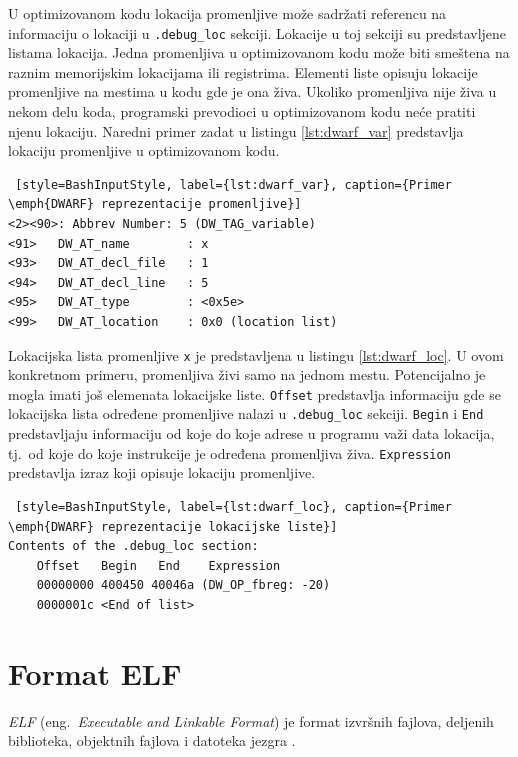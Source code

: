 \documentclass[12pt,oneside]{memoir}
\begin{document}
U optimizovanom kodu lokacija promenljive može sadržati referencu na informaciju o lokaciji u \texttt{.debug\_loc} sekciji. Lokacije u toj sekciji su predstavljene listama lokacija. Jedna promenljiva u optimizovanom kodu može biti smeštena na raznim memorijskim lokacijama ili registrima. Elementi liste opisuju lokacije promenljive na mestima u kodu gde je ona živa. Ukoliko promenljiva nije živa u nekom delu koda, programski prevodioci u optimizovanom kodu neće pratiti njenu lokaciju. Naredni primer zadat u listingu \ref{lst:dwarf_var} predstavlja lokaciju promenljive u optimizovanom kodu.

\begin{lstlisting} [style=BashInputStyle, label={lst:dwarf_var}, caption={Primer \emph{DWARF} reprezentacije promenljive}]
<2><90>: Abbrev Number: 5 (DW_TAG_variable)
<91>   DW_AT_name        : x
<93>   DW_AT_decl_file   : 1
<94>   DW_AT_decl_line   : 5
<95>   DW_AT_type        : <0x5e>
<99>   DW_AT_location    : 0x0 (location list)
\end{lstlisting}

Lokacijska lista promenljive \texttt{x} je predstavljena u listingu \ref{lst:dwarf_loc}. U ovom konkretnom primeru, promenljiva živi samo na jednom mestu. Potencijalno je mogla imati još elemenata lokacijske liste. \texttt{Offset} predstavlja informaciju gde se lokacijska lista određene promenljive nalazi u \texttt{.debug\_loc} sekciji. \texttt{Begin} i \texttt{End} predstavljaju informaciju od koje do koje adrese u programu važi data lokacija, tj.~od koje do koje instrukcije je određena promenljiva živa. \texttt{Expression} predstavlja izraz koji opisuje lokaciju promenljive.

\begin{lstlisting} [style=BashInputStyle, label={lst:dwarf_loc}, caption={Primer \emph{DWARF} reprezentacije lokacijske liste}]
Contents of the .debug_loc section:
	Offset   Begin   End    Expression
	00000000 400450 40046a (DW_OP_fbreg: -20)
	0000001c <End of list>
\end{lstlisting}


\section{Format ELF}

\emph{ELF} (eng.~\emph{Executable and Linkable Format}) je format izvršnih fajlova, deljenih biblioteka, objektnih fajlova i datoteka jezgra \cite{ELF}.
\end{document}
